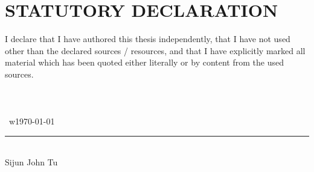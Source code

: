 \thispagestyle{empty}
\section*{STATUTORY DECLARATION}
I declare that I have authored this thesis independently, that I have not used other than the declared
sources / resources, and that I have explicitly marked all material which has been quoted either
literally or by content from the used sources.\\\\\\\\\
w\today \\[5cm]
\rule{10cm}{0.4pt}\\
Sijun John Tu